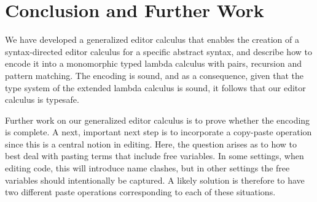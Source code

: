 \documentclass[sigplan,review]{acmart}
\begin{document}
\section{Conclusion and Further Work}

We have developed a generalized editor calculus that enables the
creation of a syntax-directed editor calculus for a specific abstract
syntax, and describe how to encode it into a monomorphic typed lambda
calculus with pairs, recursion and pattern matching. The encoding is
sound, and as a consequence, given that the type system of the
extended lambda calculus is sound, it follows that our editor calculus
is typesafe.

Further work on our generalized editor calculus is to prove whether
the encoding is complete.  A next, important next step is to
incorporate a copy-paste operation since this is a central notion in
editing. Here, the question arises as to how to best deal with pasting
terms that include free variables. In some settings, when editing
code, this will introduce name clashes, but in other settings the free
variables should intentionally be captured. A likely solution is
therefore to have two different paste operations corresponding to each
of these situations.



\end{document}
